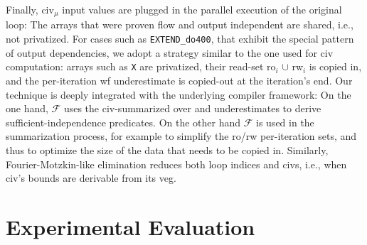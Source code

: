 \documentclass{sig-alternate}
\begin{document}
Finally, {\sc civ}$_\mu$ input values are plugged in the 
parallel execution of the original loop: The arrays that were proven flow and output
independent are shared, i.e., not privatized.   For cases such as {\tt EXTEND\_do400},
that exhibit the special pattern of output dependencies, we adopt a strategy similar
to the one used for {\sc civ} computation: arrays such as {\tt X} are privatized,
their read-set {\sc ro}$_i$ $\cup$ {\sc rw}$_i$ is copied in, and the per-iteration {\sc wf} underestimate
is copied-out at the iteration's end.   Our technique is deeply integrated with the
underlying compiler framework: On the one hand, $\mathcal{F}$ uses the {\sc civ}-summarized
over and underestimates to derive sufficient-independence predicates.
%
On the other hand $\mathcal{F}$ is used in the summarization process, for example 
to simplify the {\sc ro}/{\sc rw} per-iteration sets, and thus to optimize the 
size of the data that needs to be copied in.  Similarly, Fourier-Motzkin-like
elimination reduces both loop indices and {\sc civ}s, i.e., when {\sc civ}'s 
bounds are derivable from its {\sc veg}. %



\section{Experimental Evaluation}
\label{sec:EmpEval}
\end{document}
